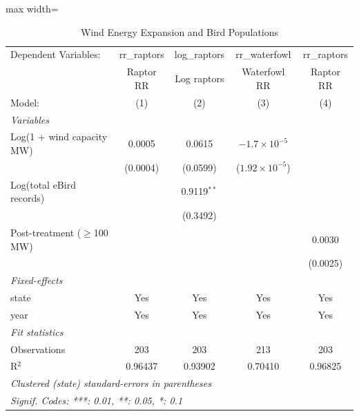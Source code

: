 \begin{table}[htbp]
\centering
\caption{Wind Energy Expansion and Bird Populations}
\label{tab:main}

\begingroup
\centering
\footnotesize
\begin{adjustbox}{max width=\textwidth}
\begin{tabular}{lcccc}
   \tabularnewline \midrule \midrule
   Dependent Variables:           & rr\_raptors  & log\_raptors  & rr\_waterfowl           & rr\_raptors\\   
                                  & Raptor RR    & Log raptors   & Waterfowl RR            & Raptor RR \\   
   Model:                         & (1)          & (2)           & (3)                     & (4)\\  
   \midrule
   \emph{Variables}\\
   Log(1 + wind capacity MW)      & 0.0005       & 0.0615        & $-1.7\times 10^{-5}$    &   \\   
                                  & (0.0004)     & (0.0599)      & ($1.92\times 10^{-5}$)  &   \\   
   Log(total eBird records)       &              & 0.9119$^{**}$ &                         &   \\   
                                  &              & (0.3492)      &                         &   \\   
   Post-treatment ($\geq$100 MW)  &              &               &                         & 0.0030\\   
                                  &              &               &                         & (0.0025)\\   
   \midrule
   \emph{Fixed-effects}\\
   state                          & Yes          & Yes           & Yes                     & Yes\\  
   year                           & Yes          & Yes           & Yes                     & Yes\\  
   \midrule
   \emph{Fit statistics}\\
   Observations                   & 203          & 203           & 213                     & 203\\  
   R$^2$                          & 0.96437      & 0.93902       & 0.70410                 & 0.96825\\  
   \midrule \midrule
   \multicolumn{5}{l}{\emph{Clustered (state) standard-errors in parentheses}}\\
   \multicolumn{5}{l}{\emph{Signif. Codes: ***: 0.01, **: 0.05, *: 0.1}}\\
\end{tabular}
\end{adjustbox}
\par\endgroup



\end{table}
